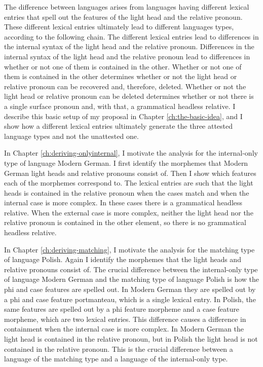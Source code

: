The difference between languages arises from languages having different lexical entries that spell out the features of the light head and the relative pronoun. These different lexical entries ultimately lead to different languages types, according to the following chain.
The different lexical entries lead to differences in the internal syntax of the light head and the relative pronoun.
Differences in the internal syntax of the light head and the relative pronoun lead to differences in whether or not one of them is contained in the other.
Whether or not one of them is contained in the other determines whether or not the light head or relative pronoun can be recovered and, therefore, deleted.
Whether or not the light head or relative pronoun can be deleted determines whether or not there is a single surface pronoun and, with that, a grammatical headless relative.
I describe this basic setup of my proposal in Chapter \ref{ch:the-basic-idea}, and I show how a different lexical entries ultimately generate the three attested language types and not the unattested one.

In Chapter \ref{ch:deriving-onlyinternal}, I motivate the analysis for the internal-only type of language Modern German. I first identify the morphemes that Modern German light heads and relative pronouns consist of. Then I show which features each of the morphemes correspond to. The lexical entries are such that the light heads is contained in the relative pronoun when the cases match and when the internal case is more complex. In these cases there is a grammatical headless relative. When the external case is more complex, neither the light head nor the relative pronoun is contained in the other element, so there is no grammatical headless relative.

In Chapter \ref{ch:deriving-matching}, I motivate the analysis for the matching type of language Polish. Again I identify the morphemes that the light heads and relative pronouns consist of. The crucial difference between the internal-only type of language Modern German and the matching type of language Polish is how the phi and case features are spelled out. In Modern German they are spelled out by a phi and case feature portmanteau, which is a single lexical entry. In Polish, the same features are spelled out by a phi feature morpheme and a case feature morpheme, which are two lexical entries. This difference causes a difference in containment when the internal case is more complex. In Modern German the light head is contained in the relative pronoun, but in Polish the light head is not contained in the relative pronoun. This is the crucial difference between a language of the matching type and a language of the internal-only type.

